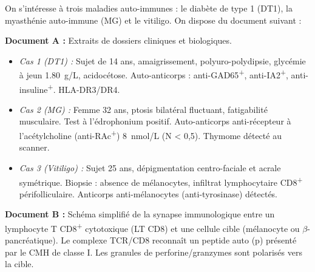 \documentclass[11pt]{article}
\begin{document}
\begin{exercice}
On s'intéresse à trois maladies auto-immunes : le diabète de type 1 (DT1), la myasthénie auto-immune (MG) et le vitiligo. On dispose du document suivant :

\textbf{Document A :} Extraits de dossiers cliniques et biologiques.
\begin{itemize}
    \item \textit{Cas 1 (DT1) :} Sujet de 14 ans, amaigrissement, polyuro-polydipsie, glycémie à jeun \SI{1.80}{g/L}, acidocétose. Auto-anticorps : anti-GAD65\textsuperscript{+}, anti-IA2\textsuperscript{+}, anti-insuline\textsuperscript{+}. HLA-DR3/DR4.
    \item \textit{Cas 2 (MG) :} Femme 32 ans, ptosis bilatéral fluctuant, fatigabilité musculaire. Test à l'édrophonium positif. Auto-anticorps anti-récepteur à l'acétylcholine (anti-RAc\textsuperscript{+}) \SI{8}{nmol/L} (N < 0,5). Thymome détecté au scanner.
    \item \textit{Cas 3 (Vitiligo) :} Sujet 25 ans, dépigmentation centro-faciale et acrale symétrique. Biopsie : absence de mélanocytes, infiltrat lymphocytaire CD8\textsuperscript{+} périfolliculaire. Anticorps anti-mélanocytes (anti-tyrosinase) détectés.
\end{itemize}

\textbf{Document B :} Schéma simplifié de la synapse immunologique entre un lymphocyte T CD8\textsuperscript{+} cytotoxique (LT CD8) et une cellule cible (mélanocyte ou $\beta$-pancréatique). Le complexe TCR/CD8 reconnaît un peptide auto (p) présenté par le CMH de classe I. Les granules de perforine/granzymes sont polarisés vers la cible.


\end{exercice}
\end{document}
